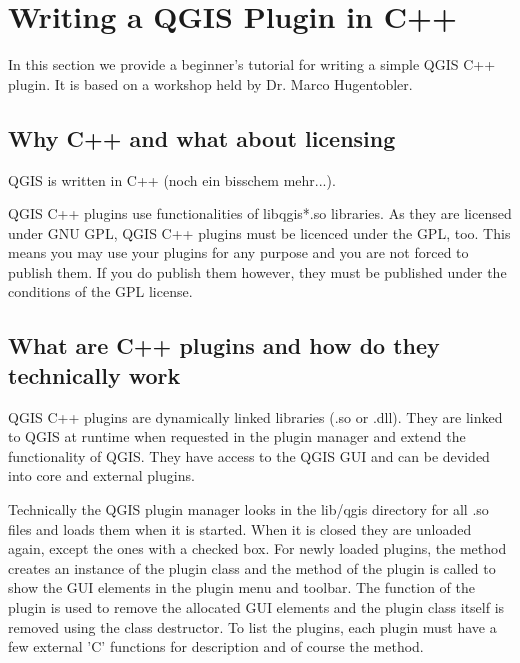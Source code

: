 \section{Writing a QGIS Plugin in C++}\label{cpp_plugin}

\updatedisclaimer

In this section we provide a beginner's tutorial for writing a simple QGIS
C++ plugin. It is based on a workshop held by Dr. Marco Hugentobler. 

\subsection{Why C++ and what about licensing}

QGIS is written in C++ (noch ein bisschem mehr...). 


QGIS C++ plugins use functionalities of libqgis*.so libraries. As they are
licensed under GNU GPL, QGIS C++ plugins must be licenced under the GPL, too.
This means you may use your plugins for any purpose and you are not forced to
publish them. If you do publish them however, they must be published under
the conditions of the GPL license. 

\subsection{What are C++ plugins and how do they technically work}

QGIS C++ plugins are dynamically linked libraries (.so or .dll). They are
linked to QGIS at runtime when requested in the plugin manager and extend the
functionality of QGIS. They have access to the QGIS GUI and can be devided
into core and external plugins.

Technically the QGIS plugin manager looks in the lib/qgis directory for all
.so files and loads them when it is started. When it is closed they are
unloaded again, except the ones with a checked box. For newly loaded plugins,
the  method creates an instance of the plugin class and
the  method of the plugin is called to show the GUI elements
in the plugin menu and toolbar. The  function of the plugin
is used to remove the allocated GUI elements and the plugin class itself is
removed using the class destructor. To list the plugins, each plugin must
have a few external 'C' functions for description and of course the
 method.

